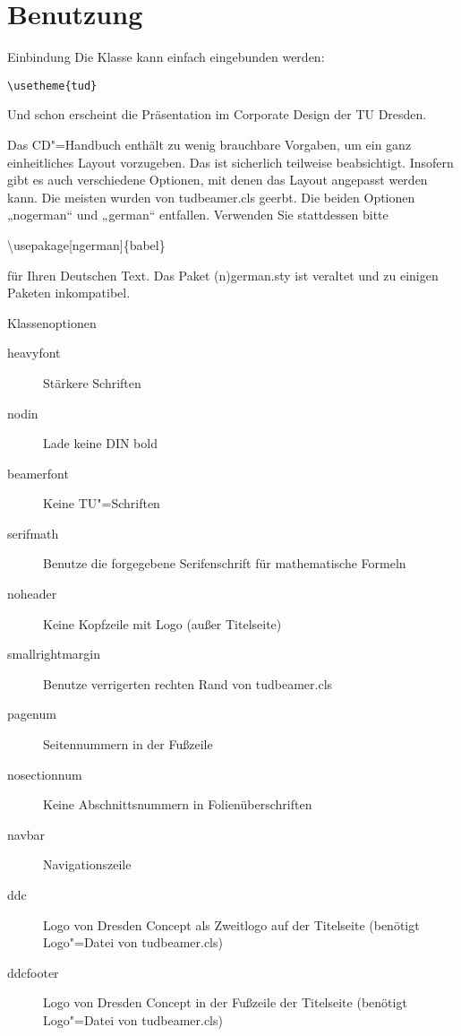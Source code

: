 \section{Benutzung}
\begin{frame}{Einbindung}
  Die Klasse kann einfach eingebunden werden:
  \begin{block}{}
    \texttt{\textbackslash usetheme\{tud\}}
  \end{block}
  Und schon erscheint die Präsentation im Corporate Design der TU Dresden. 

  Das CD"=Handbuch enthält zu wenig brauchbare Vorgaben, um ein ganz einheitliches Layout vorzugeben. Das ist sicherlich teilweise beabsichtigt. Insofern gibt es auch verschiedene Optionen, mit denen das Layout angepasst werden kann. Die meisten wurden von tudbeamer.cls geerbt. Die beiden Optionen „nogerman“ und „german“ entfallen. Verwenden Sie stattdessen bitte
  \begin{block}{}
    \textbackslash usepakage[ngerman]\{babel\}
  \end{block}
  für Ihren Deutschen Text. Das Paket (n)german.sty ist veraltet und zu einigen Paketen inkompatibel.
  \end{frame}
\begin{frame}{Klassenoptionen}
  \begin{description}
    \item[heavyfont] Stärkere Schriften
    \item[nodin] Lade keine {\dinfamily DIN bold}
    \item[beamerfont] Keine TU"=Schriften
    \item[serifmath] Benutze die forgegebene Serifenschrift für mathematische Formeln
    \item[noheader] Keine Kopfzeile mit Logo (außer Titelseite)
    \item[smallrightmargin] Benutze verrigerten rechten Rand von tudbeamer.cls
    \item[pagenum] Seitennummern in der Fußzeile
    \item[nosectionnum] Keine Abschnittsnummern in Folienüberschriften
    \item[navbar] Navigationszeile
    \item[ddc] Logo von Dresden Concept als Zweitlogo auf der Titelseite (benötigt Logo"=Datei von tudbeamer.cls) 
    \item[ddcfooter] Logo von Dresden Concept in der Fußzeile der Titelseite (benötigt Logo"=Datei von tudbeamer.cls)
  \end{description}
\end{frame}
